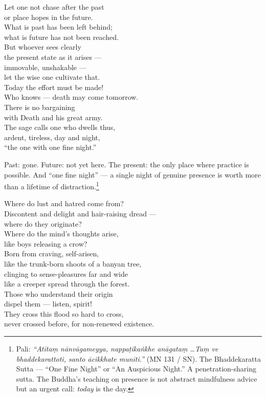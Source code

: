 \begin{versebox}
Let one not chase after the past\\
or place hopes in the future.\\
What is past has been left behind;\\
what is future has not been reached.\\[6pt]
But whoever sees clearly\\
the present state as it arises ---\\
immovable, unshakable ---\\
let the wise one cultivate that.\\[6pt]
Today the effort must be made!\\
Who knows --- death may come tomorrow.\\
There is no bargaining\\
with Death and his great army.\\[6pt]
The sage calls one who dwells thus,\\
ardent, tireless, day and night,\\
``the one with one fine night.''
\end{versebox}

\noindent Past: gone. Future: not yet here. The present: the only place where practice is possible. And ``one fine night'' --- a single night of genuine presence is worth more than a lifetime of distraction.\footnote{Pali: \textit{``Atītaṃ nānvāgameyya, nappaṭikaṅkhe anāgataṃ \ldots Taṃ ve bhaddekarattoti, santo ācikkhate munīti.''} (MN 131 / SN). The Bhaddekaratta Sutta --- ``One Fine Night'' or ``An Auspicious Night.'' A penetration-sharing sutta. The Buddha's teaching on presence is not abstract mindfulness advice but an urgent call: \textit{today} is the day.}

\begin{versebox}
Where do lust and hatred come from?\\
Discontent and delight and hair-raising dread ---\\
where do they originate?\\
Where do the mind's thoughts arise,\\
like boys releasing a crow?\\[6pt]
Born from craving, self-arisen,\\
like the trunk-born shoots of a banyan tree,\\
clinging to sense-pleasures far and wide\\
like a creeper spread through the forest.\\[6pt]
Those who understand their origin\\
dispel them --- listen, spirit!\\
They cross this flood so hard to cross,\\
never crossed before, for non-renewed existence.
\end{versebox}

